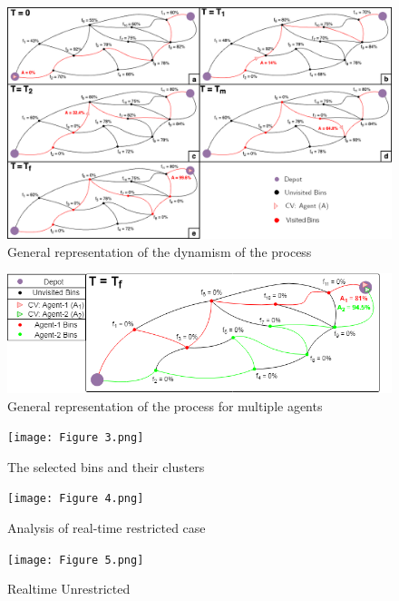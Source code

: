 \documentclass[12pt]{article}
\begin{document}
\begin{figure}[H]
    \centering
    \includegraphics[scale=0.55]{Figure 1.png}
    \caption{General representation of the dynamism of the process}\label{fige}
\end{figure}


\newpage

\begin{figure}[H]
    \centering
    \includegraphics[scale=0.6]{Figure 2.png}
    \caption{General representation of the process for multiple agents}\label{fige2}
\end{figure}

\newpage

\begin{figure}[H]
    \centering
    \texttt{[image: Figure 3.png]}
    \caption{The selected bins and their clusters}\label{figm}
\end{figure}

\newpage
\begin{figure}[H]
    \centering
    \texttt{[image: Figure 4.png]}
    \caption{Analysis of real-time restricted case}\label{figcom}
\end{figure}
\newpage

\begin{figure}[H]
    \centering
    \texttt{[image: Figure 5.png]} %
    \caption{Realtime Unrestricted}\label{fig2}
\end{figure}
\end{document}
